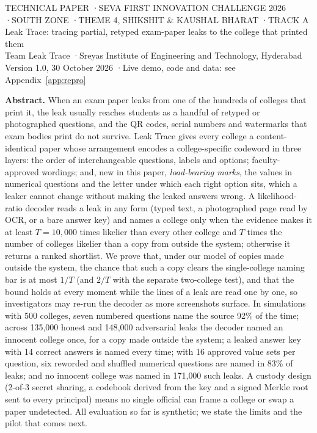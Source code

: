 \documentclass[10pt,a4paper]{article}
\theoremstyle{remark}
\begin{document}
\thispagestyle{first}

\begin{flushleft}
{\sffamily\scriptsize\color{form}\MakeUppercase{Technical paper \quad·\quad Seva First Innovation Challenge 2026 \quad·\quad South Zone \quad·\quad Theme 4, Shikshit \& Kaushal Bharat \quad·\quad Track A}}\\[10pt]
{\interbold\fontsize{23}{27}\selectfont\color{pen} Leak Trace: tracing partial, retyped exam-paper leaks to the college that printed them}\\[9pt]
{\sffamily\normalsize Team Leak Trace \quad·\quad Sreyas Institute of Engineering and Technology, Hyderabad}\\[2pt]
{\sffamily\small\color{ink2} Version 1.0, 30 October 2026 \quad·\quad Live demo, code and data: see Appendix~\ref{app:repro}}
\end{flushleft}
\vspace{4pt}
\noindent{\color{pen}\rule{\linewidth}{1.2pt}}

\noindent\begin{minipage}{\linewidth}
\small
\textsf{\textbf{Abstract.}} When an exam paper leaks from one of the hundreds of colleges that print it, the leak usually reaches students as a handful of retyped or photographed questions, and the QR codes, serial numbers and watermarks that exam bodies print do not survive. Leak Trace gives every college a content-identical paper whose arrangement encodes a college-specific codeword in three layers: the order of interchangeable questions, labels and options; faculty-approved wordings; and, new in this paper, \emph{load-bearing marks}, the values in numerical questions and the letter under which each right option sits, which a leaker cannot change without making the leaked answers wrong. A likelihood-ratio decoder reads a leak in any form (typed text, a photographed page read by OCR, or a bare answer key) and names a college only when the evidence makes it at least $T=10{,}000$ times likelier than every other college and $T$ times the number of colleges likelier than a copy from outside the system; otherwise it returns a ranked shortlist. We prove that, under our model of copies made outside the system, the chance that such a copy clears the single-college naming bar is at most $1/T$ (and $2/T$ with the separate two-college test), and that the bound holds at every moment while the lines of a leak are read one by one, so investigators may re-run the decoder as more screenshots surface. In simulations with 500 colleges, seven numbered questions name the source 92\% of the time; across 135{,}000 honest and 148{,}000 adversarial leaks the decoder named an innocent college once, for a copy made outside the system; a leaked answer key with 14 correct answers is named every time; with 16 approved value sets per question, six reworded and shuffled numerical questions are named in 83\% of leaks; and no innocent college was named in 171{,}000 such leaks. A custody design (2-of-3 secret sharing, a codebook derived from the key and a signed Merkle root sent to every principal) means no single official can frame a college or swap a paper undetected. All evaluation so far is synthetic; we state the limits and the pilot that comes next.
\end{minipage}
\end{document}
